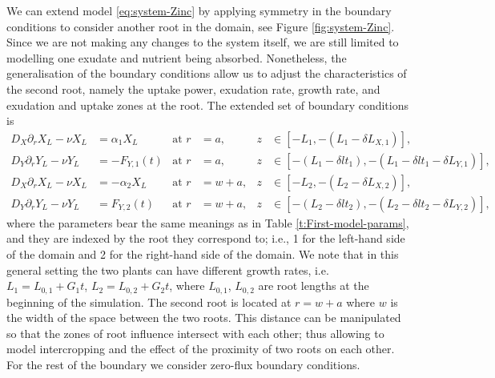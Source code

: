 \documentclass[11pt]{article}
\numberwithin{equation}{section}
\begin{document}
We can extend model \eqref{eq:system-Zinc} by applying symmetry in the boundary conditions to consider another root in the domain, see Figure \ref{fig:system-Zinc}. Since we are not making any changes to the system itself, we are still limited to modelling one exudate and nutrient being absorbed. Nonetheless, the generalisation of the boundary conditions allow us to adjust the characteristics of the second root, namely the uptake power, exudation rate, growth rate, and exudation and uptake zones at the root. The extended set of boundary conditions is
\begin{subequations}
\label{sys:extension-two-roots}
\begin{align}
    D_X \partial_r X_L - \nu X_L &= \alpha_1 X_L & \text{at } r &= a, & z &\in [-L_1, -(L_1 - \delta L_{X,1})], \\
    D_Y \partial_r Y_L - \nu Y_L &= -F_{Y,1}(t) &\text{at } r &= a, &z &\in [-({L}_1 - \delta {lt}_1), -({L}_1 - \delta {lt}_1 - \delta {L}_{Y,1})], \\
    D_X \partial_r X_L - \nu X_L &= -\alpha_2 X_L & \text{at } r &= w+a, &z &\in [-L_2, -(L_2 - \delta L_{X,2})], \\
    D_Y \partial_r Y_L - \nu Y_L &= F_{Y,2}(t) &\text{at } r &= w+a, &z &\in [-({L}_2 - \delta {lt}_2), -({L}_2 - \delta {lt}_2 - \delta {L}_{Y,2})],
\end{align}
\end{subequations}
where the parameters bear the same meanings as in Table \ref{t:First-model-params}, and they are indexed by the root they correspond to; i.e., 1 for the left-hand side of the domain and 2 for the right-hand side of the domain. We note that in this general setting the two plants can have different growth rates, i.e. $L_1 = L_{0,1} + G_1t$, $L_2 = L_{0,2} + G_2t$, where $L_{0,1}$, $L_{0,2}$ are root lengths at the beginning of the simulation. The second root is located at $r = w+a$ where $w$ is the width of the space between the two roots. This distance can be manipulated so that the zones of root influence intersect with each other; thus allowing to model intercropping and the effect of the proximity of two roots on each other. For the rest of the boundary we consider zero-flux boundary conditions.
\end{document}
